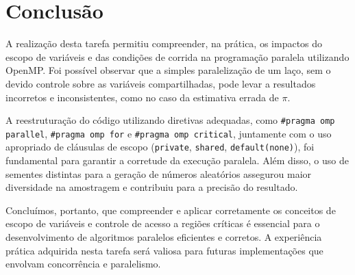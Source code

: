 \documentclass[a4paper, 12pt]{article}
\begin{document}
	\section{Conclusão}
	
	\hspace{0.7cm}A realização desta tarefa permitiu compreender, na prática, os impactos do escopo de variáveis e das condições de corrida na programação paralela utilizando OpenMP. Foi possível observar que a simples paralelização de um laço, sem o devido controle sobre as variáveis compartilhadas, pode levar a resultados incorretos e inconsistentes, como no caso da estimativa errada de $\pi$.
	
	\hspace{0.7cm}A reestruturação do código utilizando diretivas adequadas, como \texttt{\#pragma omp parallel}, \texttt{\#pragma omp for} e \texttt{\#pragma omp critical}, juntamente com o uso apropriado de cláusulas de escopo (\texttt{private}, \texttt{shared}, \texttt{default(none)}), foi fundamental para garantir a corretude da execução paralela. Além disso, o uso de sementes distintas para a geração de números aleatórios assegurou maior diversidade na amostragem e contribuiu para a precisão do resultado.
	
	\hspace{0.7cm}Concluímos, portanto, que compreender e aplicar corretamente os conceitos de escopo de variáveis e controle de acesso a regiões críticas é essencial para o desenvolvimento de algoritmos paralelos eficientes e corretos. A experiência prática adquirida nesta tarefa será valiosa para futuras implementações que envolvam concorrência e paralelismo.
	 
	
\end{document}
